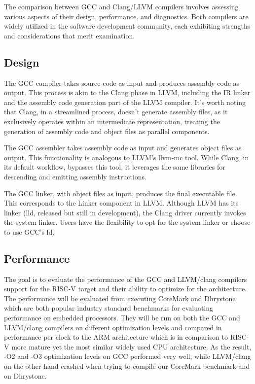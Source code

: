 \documentclass[conference]{IEEEtran}
\begin{document}
The comparison between GCC and Clang/LLVM compilers involves assessing various aspects of their design, performance, and diagnostics. Both compilers are widely utilized in the software development community, each exhibiting strengths and considerations that merit examination.

\subsection{Design}

The GCC compiler takes source code as input and produces assembly code as output. This process is akin to the Clang phase in LLVM, including the IR linker and the assembly code generation part of the LLVM compiler. It's worth noting that Clang, in a streamlined process, doesn't generate assembly files, as it exclusively operates within an intermediate representation, treating the generation of assembly code and object files as parallel components.

The GCC assembler takes assembly code as input and generates object files as output. This functionality is analogous to LLVM's llvm-mc tool. While Clang, in its default workflow, bypasses this tool, it leverages the same libraries for descending and emitting assembly instructions.

The GCC linker, with object files as input, produces the final executable file. This corresponds to the Linker component in LLVM. Although LLVM has its linker (lld, released but still in development), the Clang driver currently invokes the system linker. Users have the flexibility to opt for the system linker or choose to use GCC's ld.

\subsection{Performance}

The goal is to evaluate the performance of the GCC and LLVM/clang compilers support for the RISC-V target and their ability to optimize for the architecture. The performance will be evaluated from executing CoreMark and Dhrystone which are both popular industry standard benchmarks for evaluating performance on embedded processors. They will be run on both the GCC and LLVM/clang compilers on different optimization levels and compared in performance per clock to the ARM architecture which is in comparison to RISC-V more mature yet the most similar widely used CPU architecture. As the result, -O2 and -O3 optimization levels on GCC performed very well, while LLVM/clang on the other hand crashed when trying to compile our CoreMark benchmark and on Dhrystone.\cite{b14}
\end{document}
